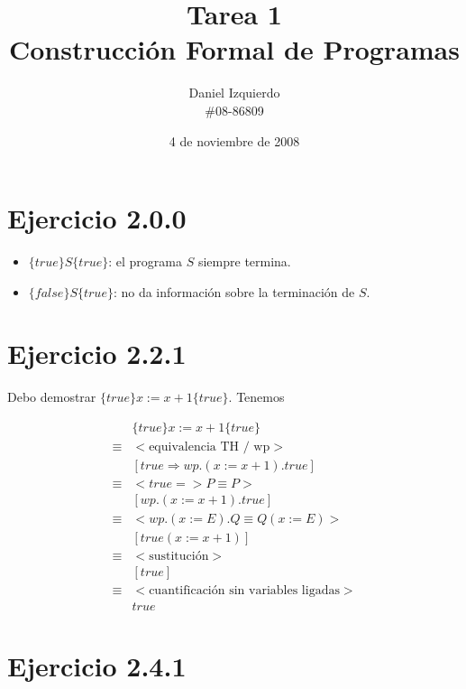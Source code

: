 \documentclass{article}
\begin{document}

\title{Tarea 1 \\ Construcción Formal de Programas}
\author{Daniel Izquierdo \\ \#08-86809}
\date{4 de noviembre de 2008}

\maketitle

\section{Ejercicio 2.0.0}

\begin{itemize}
\item $\{true\} S \{true\}$: el programa $S$ siempre termina.
\item $\{false\} S \{true\}$: no da información sobre la terminación de $S$.
\end{itemize}

\section{Ejercicio 2.2.1}

Debo demostrar $\{true\} x := x + 1 \{true\}$. Tenemos

\begin{align*}
 & \{true\} x := x + 1 \{true\} \\
 \equiv & <\text{equivalencia TH / wp}> \\
 & [ true \Rightarrow wp.(x := x + 1).true ] \\
 \equiv & <true => P \equiv P> \\
 & [ wp.(x := x + 1).true ] \\
 \equiv & <wp.(x := E).Q \equiv Q(x := E)> \\
 & [ true(x := x + 1) ] \\
 \equiv & <\text{sustitución}> \\
 & [ true ] \\
 \equiv & <\text{cuantificación sin variables ligadas}> \\
 & true
\end{align*}

\section{Ejercicio 2.4.1}
\end{document}
